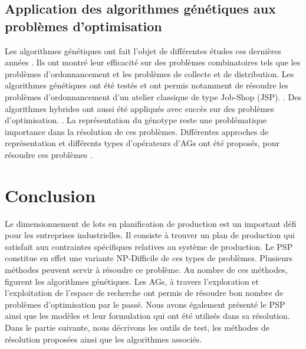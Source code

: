 	\subsection{Application des algorithmes génétiques aux problèmes d'optimisation}
	
	Les algorithmes génétiques ont fait l'objet de différentes études ces dernières années \cite{jawahar}. Ils ont montré leur efficacité sur des problèmes combinatoires tels que les problèmes d’ordonnancement \cite{davis} et les problèmes de collecte et de distribution. Les algorithmes génétiques ont été testés et ont permis notamment de résoudre les problèmes d’ordonnancement d’un atelier classique de type Job-Shop (JSP). \cite{boukef}. Des algorithmes hybrides ont aussi été appliqués avec succès sur des problèmes d'optimisation. \cite{cavalieri}. La représentation du génotype reste une problématique importance dans la résolution de ces problèmes. Différentes approches de représentation et différents types d’opérateurs d’AGs ont été proposés, pour résoudre ces problèmes \cite{suer}.
	
	\section*{Conclusion}
	Le dimensionnement de lots en planification de production est un important défi pour les entreprises industrielles. Il consiste à trouver un plan de production qui satisfait aux contraintes spécifiques relatives au système de production. Le PSP constitue en effet une variante NP-Difficile de ces types de problèmes. Plusieurs méthodes peuvent servir à résoudre ce problème. Au nombre de ces méthodes, figurent les algorithmes génétiques. Les AGs, à travers l'exploration et l'exploitation de l'espace de recherche ont permis de résoudre bon nombre de problèmes d'optimisation par le passé. Nous avons également présenté le PSP ainsi que les modèles et leur formulation qui ont été utilisés dans sa résolution.	Dans le partie suivante, nous décrivons les outils de test, les méthodes de résolution proposées ainsi que les algorithmes associés.
